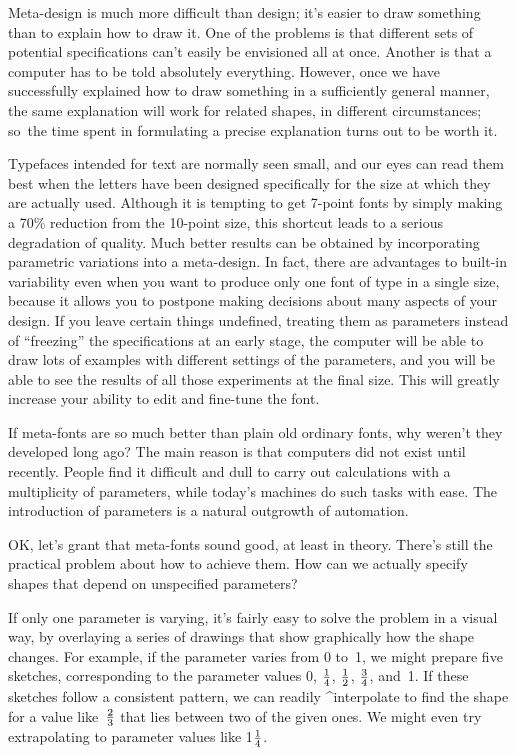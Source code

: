 Meta-design is much more difficult than design; it's easier to draw something
than to explain how to draw it. One of the problems is that different sets
of potential specifications can't easily be envisioned all at once.
Another is that a computer has to be told absolutely everything.
However, once we have successfully explained how to draw something
in a sufficiently general manner, the same explanation will work for
related shapes, in different circumstances; so~the time spent in formulating
a precise explanation turns out to be worth it.

Typefaces intended for text are normally seen small, and our eyes can read
them best when the letters have been designed specifically for the size at
which they are actually used. Although it is tempting to get 7-point fonts
by simply making a 70\% reduction from the 10-point size, this shortcut
leads to a serious degradation of quality. Much better results can be
obtained by incorporating parametric variations into a meta-design.  In
fact, there are advantages to built-in variability even when you want to
produce only one font of type in a single size, because it allows you to
postpone making decisions about many aspects of your design. If you leave
certain things undefined, treating them as parameters instead of
``freezing'' the specifications at an early stage, the computer will be
able to draw lots of examples with different settings of the parameters,
and you will be able to see the results of all those experiments at the final
size. This will greatly increase your ability to edit and fine-tune the font.

If meta-fonts are so much better than plain old ordinary fonts, why weren't
they developed long ago? The main reason is that computers did not exist until
recently. People find it difficult and dull to carry out calculations with
a multiplicity of parameters, while today's machines do such tasks with ease.
The introduction of parameters is a natural outgrowth of automation.

OK, let's grant that meta-fonts sound good, at least in theory. There's still
the practical problem about how to achieve them. How can we actually
specify shapes that depend on unspecified parameters?

If only one parameter is varying, it's fairly easy to solve the problem in
a visual way, by overlaying a series of drawings that show graphically how
the shape changes. For example, if the parameter varies from 0 to~1, we
might prepare five sketches, corresponding to the parameter values 0,
$1\over4$, $1\over2$, $3\over4$, and~1. If these sketches follow a
consistent pattern, we can readily ^{interpolate} to find the shape for a
value like~$2\over3$ that lies between two of the given ones. We might
even try extrapolating to parameter values like 1$1\over4$.

